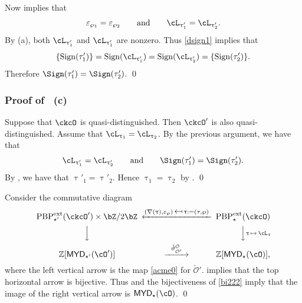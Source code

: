 \documentclass[11pt,a4paper]{amsart}
\def\MYD{{\mathsf{MYD}}}
\newcommand{\CO}{{\mathcal {O}}}
\newcommand{\Z}{\mathbb{Z}}
\newcommand{\be}{\begin {equation}}
\newcommand{\ee}{\end {equation}}
\numberwithin{equation}{section}
\theoremstyle{remark}
\def\PBPes{\mathrm{PBP}^{\mathrm{ext}}_{\star}}
\def\PBPesp{\mathrm{PBP}^{\mathrm{ext}}_{\star'}}
\def\MYD{{\mathsf{MYD}}}
\def\ac{\cL}
\begin{document}
Now   implies that
\[
\varepsilon_{\wp_{1}}=\varepsilon_{\wp_{2}}\qquad \textrm{and}\qquad
\ac_{\uptau'_{1}}=\ac_{\uptau'_{2}}.
\]
By  (a),  both $\ac_{\uptau'_{1}}$ and $\ac_{\uptau'_{1}}$
are nonzero. Thus
 \eqref{dsign1} implies that
 \[
\{\sign{\tau_1'}\}= \sign{\ac_{\uptau'_{1}}}= \sign{\ac_{\uptau'_{2}}}=\{\sign{\tau_2'}\}.
 \]
Therefore
$\Sign(\tau'_{1})=\Sign(\tau'_{2})$. \qed

\subsubsection*{Proof of ~(c)}
 Suppose that $\ckcO$ is quasi-distinguished. Then $\ckcO'$ is also quasi-distinguished.  Assume
that
$
\ac_{\uptau_{1}}=\ac_{\uptau_{2}}$. By the previous argument, we have that
\[
\ac_{\uptau'_{1}}=\ac_{\uptau'_{2}}\qquad \textrm{and}\qquad
\Sign(\tau'_{1})=\Sign(\tau'_{2}).
\]
By , we have that  $\uptau'_{1}=\uptau'_{2}$. Hence $\uptau_{1}=\uptau_{2}$ by .  \qed

\newcommand\mapsfrom{\mathrel{\reflectbox{\ensuremath{\mapsto}}}}

Consider the commutative diagram
\be\label{cd00}
 \begin{CD}
 \PBPesp( \ckcO' )\times \bZ/2\bZ
                  @<  (\nabla(\uptau), \varepsilon_\wp)                   \,\mapsfrom\,
                  \uptau:=(\tau, \wp)
                  <<  \PBPes( \ckcO )\\
            @VV  V         @ VV  \uptau\,\mapsto\, \ac_\uptau V \\
    \Z[\MYD_{\star'}(\cO')]  @>  \check{\vartheta}_{\check \CO'}^{\check \CO}  >> \Z[\MYD_{\star}(\cO)],
  \end{CD}
\ee
where the left vertical arrow is the map \eqref{acme0} for $\check \CO'$.  implies that the top horizontal arrow is bijective. Thus   and   the bijectiveness of \eqref{bi222} imply that the image of the right vertical arrow is $\MYD_{\star}(\cO)$. \qed
\end{document}
